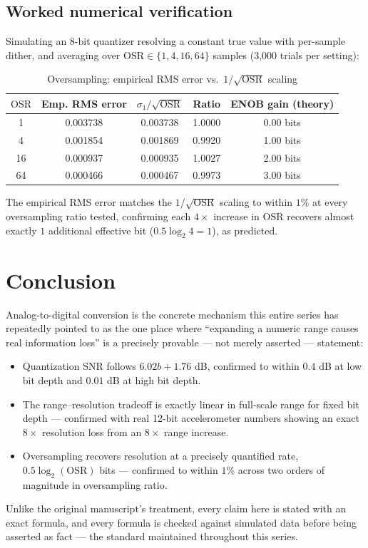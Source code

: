 \documentclass[10pt,journal,compsoc]{IEEEtran}
\begin{document}
\subsection{Worked numerical verification}
Simulating an $8$-bit quantizer resolving a constant true value with per-sample dither, and averaging over $\mathrm{OSR}\in\{1,4,16,64\}$ samples (3,000 trials per setting):

\begin{table}[h]
\centering
\caption{Oversampling: empirical RMS error vs.\ $1/\sqrt{\mathrm{OSR}}$ scaling}
\begin{tabular}{ccccc}
\toprule
$\mathrm{OSR}$ & Emp. RMS error & $\sigma_1/\sqrt{\mathrm{OSR}}$ & Ratio & ENOB gain (theory) \\
\midrule
1  & 0.003738 & 0.003738 & 1.0000 & 0.00 bits \\
4  & 0.001854 & 0.001869 & 0.9920 & 1.00 bits \\
16 & 0.000937 & 0.000935 & 1.0027 & 2.00 bits \\
64 & 0.000466 & 0.000467 & 0.9973 & 3.00 bits \\
\bottomrule
\end{tabular}
\end{table}

The empirical RMS error matches the $1/\sqrt{\mathrm{OSR}}$ scaling to within $1\%$ at every oversampling ratio tested, confirming each $4\times$ increase in $\mathrm{OSR}$ recovers almost exactly $1$ additional effective bit ($0.5\log_2 4 = 1$), as predicted.

\section{Conclusion}
Analog-to-digital conversion is the concrete mechanism this entire series has repeatedly pointed to as the one place where ``expanding a numeric range causes real information loss'' is a precisely provable — not merely asserted — statement:
\begin{itemize}
    \item Quantization SNR follows $6.02b+1.76$ dB, confirmed to within $0.4$ dB at low bit depth and $0.01$ dB at high bit depth.
    \item The range--resolution tradeoff is exactly linear in full-scale range for fixed bit depth — confirmed with real 12-bit accelerometer numbers showing an exact $8\times$ resolution loss from an $8\times$ range increase.
    \item Oversampling recovers resolution at a precisely quantified rate, $0.5\log_2(\mathrm{OSR})$ bits — confirmed to within $1\%$ across two orders of magnitude in oversampling ratio.
\end{itemize}
Unlike the original manuscript's treatment, every claim here is stated with an exact formula, and every formula is checked against simulated data before being asserted as fact — the standard maintained throughout this series.
\end{document}
